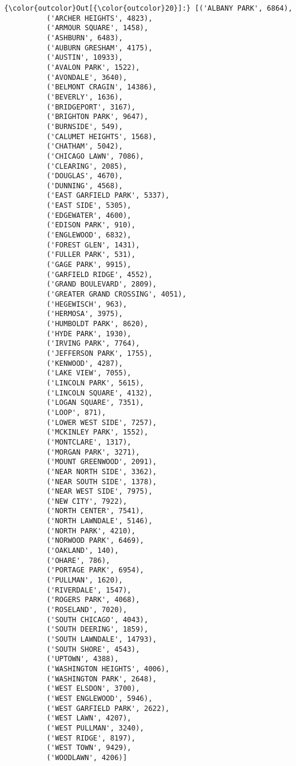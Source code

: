 \documentclass[11pt]{article}
\begin{document}
\begin{Verbatim}[commandchars=\\\{\}]
{\color{outcolor}Out[{\color{outcolor}20}]:} [('ALBANY PARK', 6864),
          ('ARCHER HEIGHTS', 4823),
          ('ARMOUR SQUARE', 1458),
          ('ASHBURN', 6483),
          ('AUBURN GRESHAM', 4175),
          ('AUSTIN', 10933),
          ('AVALON PARK', 1522),
          ('AVONDALE', 3640),
          ('BELMONT CRAGIN', 14386),
          ('BEVERLY', 1636),
          ('BRIDGEPORT', 3167),
          ('BRIGHTON PARK', 9647),
          ('BURNSIDE', 549),
          ('CALUMET HEIGHTS', 1568),
          ('CHATHAM', 5042),
          ('CHICAGO LAWN', 7086),
          ('CLEARING', 2085),
          ('DOUGLAS', 4670),
          ('DUNNING', 4568),
          ('EAST GARFIELD PARK', 5337),
          ('EAST SIDE', 5305),
          ('EDGEWATER', 4600),
          ('EDISON PARK', 910),
          ('ENGLEWOOD', 6832),
          ('FOREST GLEN', 1431),
          ('FULLER PARK', 531),
          ('GAGE PARK', 9915),
          ('GARFIELD RIDGE', 4552),
          ('GRAND BOULEVARD', 2809),
          ('GREATER GRAND CROSSING', 4051),
          ('HEGEWISCH', 963),
          ('HERMOSA', 3975),
          ('HUMBOLDT PARK', 8620),
          ('HYDE PARK', 1930),
          ('IRVING PARK', 7764),
          ('JEFFERSON PARK', 1755),
          ('KENWOOD', 4287),
          ('LAKE VIEW', 7055),
          ('LINCOLN PARK', 5615),
          ('LINCOLN SQUARE', 4132),
          ('LOGAN SQUARE', 7351),
          ('LOOP', 871),
          ('LOWER WEST SIDE', 7257),
          ('MCKINLEY PARK', 1552),
          ('MONTCLARE', 1317),
          ('MORGAN PARK', 3271),
          ('MOUNT GREENWOOD', 2091),
          ('NEAR NORTH SIDE', 3362),
          ('NEAR SOUTH SIDE', 1378),
          ('NEAR WEST SIDE', 7975),
          ('NEW CITY', 7922),
          ('NORTH CENTER', 7541),
          ('NORTH LAWNDALE', 5146),
          ('NORTH PARK', 4210),
          ('NORWOOD PARK', 6469),
          ('OAKLAND', 140),
          ('OHARE', 786),
          ('PORTAGE PARK', 6954),
          ('PULLMAN', 1620),
          ('RIVERDALE', 1547),
          ('ROGERS PARK', 4068),
          ('ROSELAND', 7020),
          ('SOUTH CHICAGO', 4043),
          ('SOUTH DEERING', 1859),
          ('SOUTH LAWNDALE', 14793),
          ('SOUTH SHORE', 4543),
          ('UPTOWN', 4388),
          ('WASHINGTON HEIGHTS', 4006),
          ('WASHINGTON PARK', 2648),
          ('WEST ELSDON', 3700),
          ('WEST ENGLEWOOD', 5946),
          ('WEST GARFIELD PARK', 2622),
          ('WEST LAWN', 4207),
          ('WEST PULLMAN', 3240),
          ('WEST RIDGE', 8197),
          ('WEST TOWN', 9429),
          ('WOODLAWN', 4206)]
\end{Verbatim}
            
\end{document}
